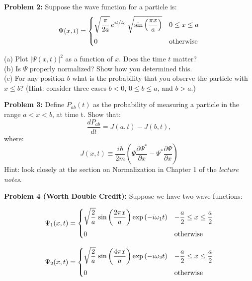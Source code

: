 \documentclass[12pt]{article}
\begin{document}
\vskip 1cm
\noindent
{\bf Problem 2:} Suppose the wave function for a particle is:
\begin{displaymath}
  \Psi(x,t) =
  \begin{cases}    
    {\displaystyle \sqrt{\frac{\pi}{2a}}\, e^{it/t_0} \, \sqrt{\sin\left(\frac{\pi x}{a}\right)}} & {\displaystyle 0 \leq x \leq a} \\[10pt]
    {\displaystyle 0} & {\displaystyle {\rm otherwise}} \\
  \end{cases}
\end{displaymath}

\noindent
(a) Plot $|\Psi(x,t)|^2$ as a function of $x$.  Does the time $t$ matter? \\[5pt]
(b) Is $\Psi$ properly normalized?  Show how you determined this.\\[5pt]
(c) For any position $b$ what is the probability that you observe the particle with $x \leq b$?  (Hint: consider three cases $b<0$, $0 \leq b \leq a$, and $b > a$.)

\vskip 1cm
\noindent
{\bf Problem 3:} Define $P_{ab}(t)$ as the probability of measuring a particle in the range $a< x < b$, at time t.  Show that:
\begin{displaymath}
  \frac{dP_{ab}}{dt} = J(a, t) - J(b, t),
\end{displaymath}
where:
\begin{displaymath}
  J(x, t) \equiv \frac{i \hbar}{2m}
  \left( \Psi \frac{\partial \Psi^*}{\partial x} - \Psi^* \frac{\partial \Psi}{\partial x}\right)
\end{displaymath}
Hint: look closely at the section on Normalization in Chapter 1 of the {\em lecture notes}.

\vskip 1cm
\noindent
{\bf Problem 4 (Worth Double Credit):} Suppose we have two wave functions:

\begin{displaymath}
  \Psi_1(x,t) =
  \begin{cases}    
    {\displaystyle \sqrt{\frac{2}{a}} \, \sin\left(\frac{2 \pi x}{a}\right) \exp\left(-i \omega_1 t\right)} & {\displaystyle -\frac{a}{2} \leq x \leq \frac{a}{2}} \\[10pt]
    {\displaystyle 0} & {\displaystyle {\rm otherwise}} \\
  \end{cases}
\end{displaymath}

\begin{displaymath}
  \Psi_2(x,t) =
  \begin{cases}    
    {\displaystyle \sqrt{\frac{2}{a}} \, \sin\left(\frac{4 \pi x}{a}\right) \exp\left(-i \omega_2 t\right)} & {\displaystyle -\frac{a}{2} \leq x \leq \frac{a}{2}} \\[10pt]
    {\displaystyle 0} & {\displaystyle {\rm otherwise}} \\
  \end{cases}
\end{displaymath}
\end{document}
